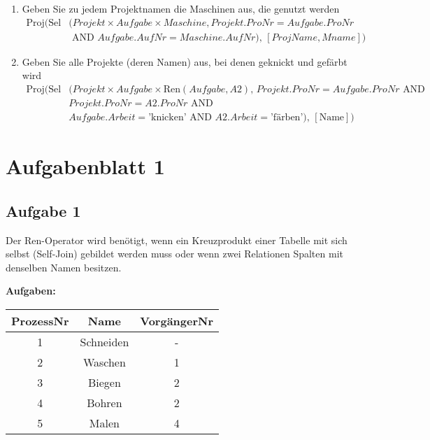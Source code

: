 \begin{enumerate}
    \item Geben Sie zu jedem Projektnamen die Maschinen aus, die genutzt werden
        \begin{align*}
            \text{Proj}\bigl(
            \text{Sel}&(Projekt \times Aufgabe \times Maschine, Projekt.ProNr = Aufgabe.ProNr \\ 
            &\text{ AND } Aufgabe.AufNr = Maschine.AufNr),\, [ProjName, Mname]
            \bigr)
        \end{align*}

    \item Geben Sie alle Projekte (deren Namen) aus, bei denen geknickt und gefärbt wird
        \begin{align*}
            \text{Proj}\bigl(
            \text{Sel}&(Projekt \times Aufgabe \times \text{Ren}(Aufgabe, A2),\, 
            Projekt.ProNr = Aufgabe.ProNr \text{ AND } \\
            &Projekt.ProNr = A2.ProNr \text{ AND } \\
            &Aufgabe.Arbeit = \text{'knicken'} \text{ AND } A2.Arbeit = \text{'färben'}),\, 
            [\text{Name}]
            \bigr)
        \end{align*}
\end{enumerate}

\newpage
\section{Aufgabenblatt 1}
\subsection{Aufgabe 1}
Der Ren-Operator wird benötigt, wenn ein Kreuzprodukt einer Tabelle mit sich selbst (Self-Join) gebildet werden muss oder wenn zwei Relationen Spalten mit denselben Namen besitzen.
    \begin{table}[H]
        \centering
        \textbf{Aufgaben:} \\ [10pt]
        \begin{tabular}{|c|c|c|}
            \hline
            \textbf{ProzessNr} & \textbf{Name} & \textbf{VorgängerNr} \\
            \hline
            1 & Schneiden   & - \\
            2 & Waschen     & 1 \\
            3 & Biegen      & 2 \\
            4 & Bohren      & 2 \\
            5 & Malen       & 4\\
            \hline
        \end{tabular}
    \end{table}

